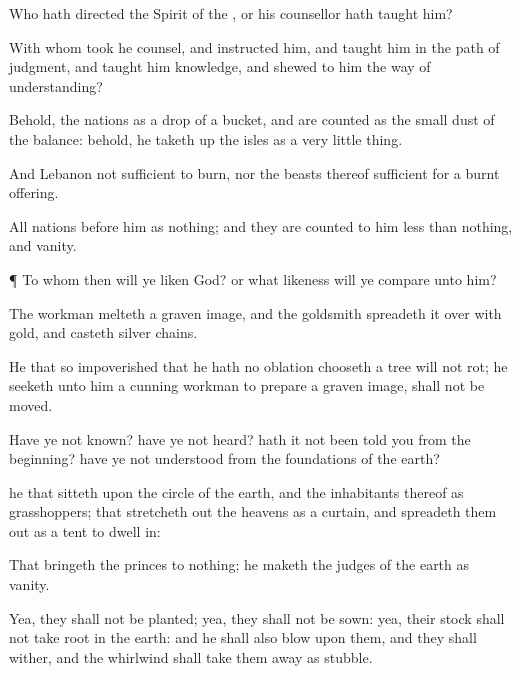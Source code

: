 {Who hath
directed the
Spirit of the
{}, or
{} his
counsellor hath
taught him?

With whom took he
counsel, and
{}
instructed him, and
taught him in the
path of
judgment, and
taught him
knowledge, and
shewed to him the
way of
understanding?

Behold, the
nations
{} as a
drop of a
bucket, and are
counted as the small
dust of the
balance: behold, he taketh
up the
isles as a very little
thing.

And
Lebanon
{}
not
sufficient to
burn, nor the
beasts thereof
sufficient for a burnt
offering.

All
nations before him
{} as nothing; and they are
counted to him less than
nothing, and
vanity.


\par }{\PP {}¶ To whom then will ye
liken
God? or what
likeness will ye
compare unto him?

The
workman
melteth a graven
image, and the
goldsmith
spreadeth it over with
gold, and
casteth
silver
chains.

He that
{} so
impoverished that he hath no
oblation
chooseth a
tree
{} will not
rot; he
seeketh unto him a
cunning
workman to
prepare a graven
image,
{} shall not be
moved.

Have ye not
known? have ye not
heard? hath it not been
told you from the
beginning? have ye not
understood from the
foundations of the
earth?

 he that
sitteth upon the
circle of the
earth, and the
inhabitants thereof
{} as
grasshoppers; that stretcheth
out the
heavens as a
curtain, and spreadeth them
out as a
tent to dwell
in:

That
bringeth the
princes to nothing; he
maketh the
judges of the
earth as
vanity.

Yea, they shall not be
planted; yea, they shall not be
sown: yea, their
stock shall not take
root in the
earth: and he shall also
blow upon them, and they shall
wither, and the
whirlwind shall
take them away as
stubble.

}
